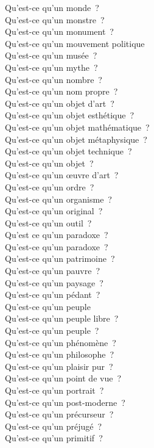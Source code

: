 \documentclass[a4paper,12pt]{article}
\begin{document}
Qu'est-ce qu'un monde ? \\
Qu'est-ce qu'un monstre ? \\
Qu'est-ce qu'un monument ? \\
Qu'est-ce qu'un mouvement politique \\
Qu'est-ce qu'un musée ? \\
Qu'est-ce qu'un mythe ? \\
Qu'est-ce qu'un nombre ? \\
Qu'est-ce qu'un nom propre ? \\
Qu'est-ce qu'un objet d'art ? \\
Qu'est-ce qu'un objet esthétique ? \\
Qu'est-ce qu'un objet mathématique ? \\
Qu'est-ce qu'un objet métaphysique ? \\
Qu'est-ce qu'un objet technique ? \\
Qu'est-ce qu'un objet ? \\
Qu'est-ce qu'un œuvre d'art ? \\
Qu'est-ce qu'un ordre ? \\
Qu'est-ce qu'un organisme ? \\
Qu'est-ce qu'un original ? \\
Qu'est-ce qu'un outil ? \\
Qu'est ce qu'un paradoxe ? \\
Qu'est-ce qu'un paradoxe ? \\
Qu'est-ce qu'un patrimoine ? \\
Qu'est-ce qu'un pauvre ? \\
Qu'est-ce qu'un paysage ? \\
Qu'est-ce qu'un pédant ? \\
Qu'est-ce qu'un peuple \\
Qu'est-ce qu'un peuple libre ? \\
Qu'est-ce qu'un peuple ? \\
Qu'est-ce qu'un phénomène ? \\
Qu'est-ce qu'un philosophe ? \\
Qu'est-ce qu'un plaisir pur ? \\
Qu'est-ce qu'un point de vue ? \\
Qu'est-ce qu'un portrait ? \\
Qu'est-ce qu'un post-moderne ? \\
Qu'est-ce qu'un précurseur ? \\
Qu'est-ce qu'un préjugé ? \\
Qu'est-ce qu'un primitif ? \\
\end{document}
